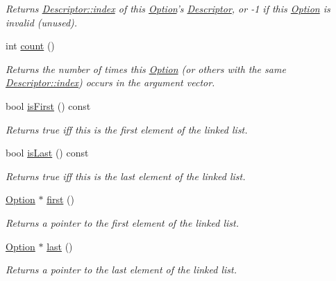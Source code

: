 \begin{DoxyCompactItemize}
\begin{DoxyCompactList}\small\item\em \-Returns \hyperlink{structoption_1_1_descriptor_a1fee8ac44f529c99ac2b1149b4c391b1}{\-Descriptor\-::index} of this \hyperlink{classoption_1_1_option}{\-Option}'s \hyperlink{structoption_1_1_descriptor}{\-Descriptor}, or -\/1 if this \hyperlink{classoption_1_1_option}{\-Option} is invalid (unused). \end{DoxyCompactList}\item 
int \hyperlink{classoption_1_1_option_a8a632dcd89af60fe0806deb756c08f14}{count} ()
\begin{DoxyCompactList}\small\item\em \-Returns the number of times this \hyperlink{classoption_1_1_option}{\-Option} (or others with the same \hyperlink{structoption_1_1_descriptor_a1fee8ac44f529c99ac2b1149b4c391b1}{\-Descriptor\-::index}) occurs in the argument vector. \end{DoxyCompactList}\item 
bool \hyperlink{classoption_1_1_option_aee7a11f90cf4b70f65fb6bdf4db2c922}{is\-First} () const 
\begin{DoxyCompactList}\small\item\em \-Returns true iff this is the first element of the linked list. \end{DoxyCompactList}\item 
bool \hyperlink{classoption_1_1_option_ad60789506c3df60dedd4a006af56ece9}{is\-Last} () const 
\begin{DoxyCompactList}\small\item\em \-Returns true iff this is the last element of the linked list. \end{DoxyCompactList}\item 
\hyperlink{classoption_1_1_option}{\-Option} $\ast$ \hyperlink{classoption_1_1_option_abb4e13cd7c90999c8a6b1f871cece283}{first} ()
\begin{DoxyCompactList}\small\item\em \-Returns a pointer to the first element of the linked list. \end{DoxyCompactList}\item 
\hyperlink{classoption_1_1_option}{\-Option} $\ast$ \hyperlink{classoption_1_1_option_afe2aff68191e55b59c53fac3dbbcd7c3}{last} ()
\begin{DoxyCompactList}\small\item\em \-Returns a pointer to the last element of the linked list. \end{DoxyCompactList}\item 

\end{DoxyCompactItemize}
